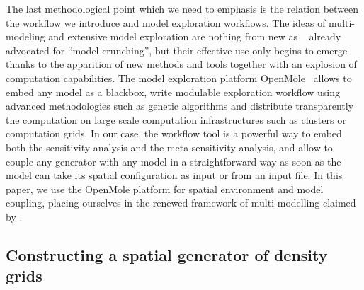 \documentclass[Afour,sageh,times]{sagej}
\begin{document}

The last methodological point which we need to emphasis is the relation between the workflow we introduce and model exploration workflows. The ideas of multi-modeling and extensive model exploration are nothing from new as ~\cite{openshaw1983data} already advocated for ``model-crunching'', but their effective use only begins to emerge thanks to the apparition of new methods and tools together with an explosion of computation capabilities. The model exploration platform OpenMole~\citep{reuillon2013openmole} allows to embed any model as a blackbox, write modulable exploration workflow using advanced methodologies such as genetic algorithms and distribute transparently the computation on large scale computation infrastructures such as clusters or computation grids. In our case, the workflow tool is a powerful way to embed both the sensitivity analysis and the meta-sensitivity analysis, and allow to couple any generator with any model in a straightforward way as soon as the model can take its spatial configuration as input or from an input file. In this paper, we use the OpenMole platform for spatial environment and model coupling, placing ourselves in the renewed framework of multi-modelling claimed by \citet{cottineau2015modular}.
\subsection{Constructing a spatial generator of density grids}
\end{document}
